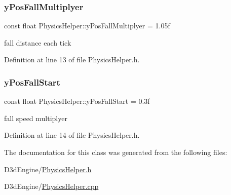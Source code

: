 \subsubsection{\texorpdfstring{y\+Pos\+Fall\+Multiplyer}{yPosFallMultiplyer}}
{\footnotesize\ttfamily const float Physics\+Helper\+::y\+Pos\+Fall\+Multiplyer = 1.\+05f\hspace{0.3cm}{\ttfamily [private]}}



fall distance each tick 



Definition at line 13 of file Physics\+Helper.\+h.

\mbox{\label{class_physics_helper_a11582a39916e5ec33325d99d1d67235a}} 
\subsubsection{\texorpdfstring{y\+Pos\+Fall\+Start}{yPosFallStart}}
{\footnotesize\ttfamily const float Physics\+Helper\+::y\+Pos\+Fall\+Start = 0.\+3f\hspace{0.3cm}{\ttfamily [private]}}



fall speed multiplyer 



Definition at line 14 of file Physics\+Helper.\+h.



The documentation for this class was generated from the following files\+:\begin{DoxyCompactItemize}
\item 
D3d\+Engine/\mbox{\hyperlink{_physics_helper_8h}{Physics\+Helper.\+h}}\item 
D3d\+Engine/\mbox{\hyperlink{_physics_helper_8cpp}{Physics\+Helper.\+cpp}}\end{DoxyCompactItemize}
